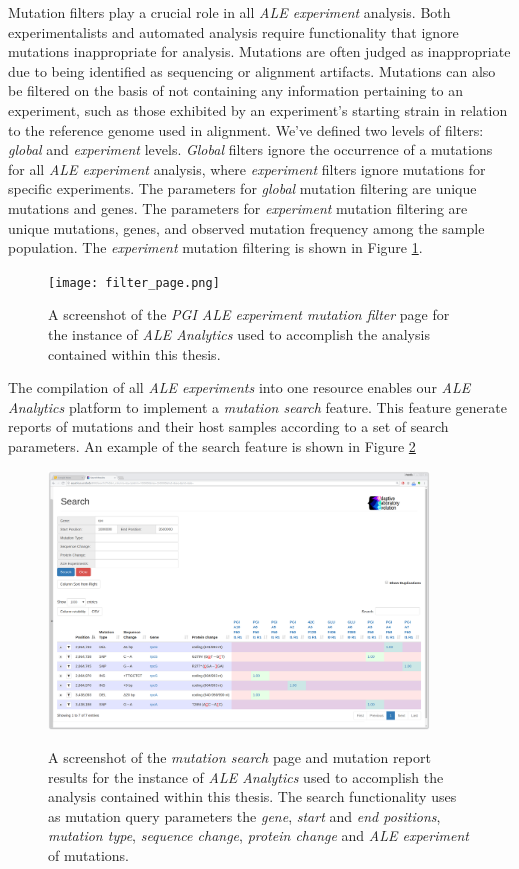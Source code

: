 \documentclass[12pt,final,masters,chapterheads]{ucsd}  %
\begin{document}
Mutation filters play a crucial role in all \textit{ALE experiment} analysis. Both experimentalists and automated analysis require functionality that ignore mutations inappropriate for analysis. Mutations are often judged as inappropriate due to being identified as sequencing or alignment artifacts. Mutations can also be filtered on the basis of not containing any information pertaining to an experiment, such as those exhibited by an experiment's starting strain in relation to the reference genome used in alignment. We've defined two levels of filters: \textit{global} and \textit{experiment} levels. \textit{Global} filters ignore the occurrence of a mutations for all \textit{ALE experiment} analysis, where \textit{experiment} filters ignore mutations for specific experiments. The parameters for \textit{global} mutation filtering are unique mutations and genes. The parameters for \textit{experiment} mutation filtering are unique mutations, genes, and observed mutation frequency among the sample population. The \textit{experiment} mutation filtering is shown in Figure \ref{fig:filter_page}.
\begin{figure}[H]
  \caption{A screenshot of the \textit{PGI ALE experiment mutation filter} page for the instance of \textit{ALE Analytics} used to accomplish the analysis contained within this thesis.}
  \centering
  \texttt{[image: filter\_page.png]}
  \label{fig:filter_page}
\end{figure}
The compilation of all \textit{ALE experiments} into one resource enables our \textit{ALE Analytics} platform to implement a \textit{mutation search} feature. This feature generate reports of mutations and their host samples according to a set of search parameters. An example of the search feature is shown in Figure \ref{fig:search_page}
\begin{figure}[H]
  \caption{A screenshot of the \textit{mutation search} page and mutation report results for the instance of \textit{ALE Analytics} used to accomplish the analysis contained within this thesis. The search functionality uses as mutation query parameters the \textit{gene}, \textit{start} and \textit{end positions}, \textit{mutation type}, \textit{sequence change}, \textit{protein change} and \textit{ALE experiment} of mutations.}
  \centering
  \includegraphics[width=0.9\textwidth]{search_page.png}
  \label{fig:search_page}
\end{figure}
\end{document}
